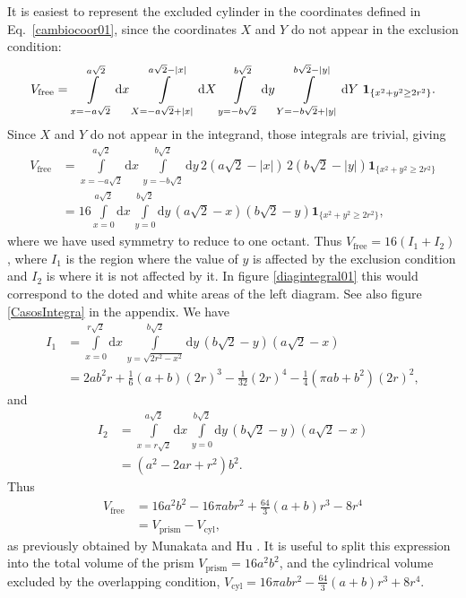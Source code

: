 \documentclass[superscriptaddress,pre,reprint,showpacs,onecolumn]{revtex4-1}
\newcommand{\rd}[1]{\mathrm{d}{#1} \,}
\newcommand{\indicatorsymbol}{\mathbf{1}}
\newcommand{\indicator}[1]{\indicatorsymbol_{ \{   #1 \} } }
\begin{document}
It is easiest to represent the  
excluded cylinder in the coordinates defined in 
Eq.~\ref{cambiocoor01}, since the coordinates $X$ and $Y$ 
do not appear in the exclusion condition:
\begin{equation}\label{integraltotal}
 V_\text{free} = \\ \int\limits_{x=-a \sqrt{2}}^{a \sqrt{2}} \rd x 
\int\limits_{X=-a \sqrt{2} + |x| }^{a \sqrt{2} - |x|}  \rd X
 \int\limits_{y=-b \sqrt{2}}^{b \sqrt{2}} \rd y
\int\limits_{Y=-b \sqrt{2} + |y| }^{b \sqrt{2}-|y|}  \rd Y
\, \indicator{ x^2 + y^2 \ge 2r^2  }.
\end{equation}
Since $X$ and $Y$ do not appear in the integrand, those integrals are trivial, giving
\begin{align}
 V_\text{free}  &= \int\limits_{x=-a \sqrt{2}}^{a \sqrt{2}} \rd x  \int\limits_{y=-b \sqrt{2}}^{b \sqrt{2}} \rd y
2 \left( a \sqrt{2} - |x| \right) \, 2 \left( b \sqrt{2} - |y| \right) \indicator{ x^2 + y^2 \ge 2r^2 } \\
 &= 16 \int\limits_{x=0}^{a \sqrt{2}} \rd x  \int\limits_{y=0}^{b \sqrt{2}} \rd y 
\left( a \sqrt{2} - x \right) \left( b \sqrt{2} - y \right) \indicator{ x^2 + y^2 \ge 2r^2 },
\end{align}
where we have used symmetry to reduce to one octant.
Thus $V_\text{free} = 16(I_1 + I_2)$, where $I_1$ is the region where the value of $y$
is affected by the exclusion condition and $I_2$ is where it is not affected
by it.  In figure \ref{diagintegral01} this would correspond to the doted and
white areas of the left diagram. See also figure \ref{CasosIntegra} in the appendix. 
We have
\begin{align}
 I_1 &= \int\limits_{x=0}^{r\sqrt{2}} \rd x \int\limits_{y = \sqrt{ 2r^2 - x^2}}^{b \sqrt{2}} \rd y
\left( b \sqrt{2} - y \right)  \left( a \sqrt{2} - x \right) \\
&= 	
2 a b^{2} r  + \textstyle \frac{1}{6} (a+b) (2r)^{3} - \frac{1}{32}  (2r)^{4} - \frac{1}{4} {\left(\pi a b + b^{2}\right)} (2r)^2,
\end{align}
and
\begin{align}
 I_2 &= \int\limits_{x=r  \sqrt{2}}^{a \sqrt{2}} \rd x  \int\limits_{y = 0}^{b \sqrt{2}} \rd y
 \left( b \sqrt{2} - y \right)  \left( a \sqrt{2} - x \right)  \\
&=	
{\left( a^{2} - 2ar +   r^{2}\right)} b^{2}.
\end{align}
Thus 
\begin{align}\label{volumeabd}
 V_\text{free}
 & =  16 a^{2} b^{2}  - 16 \pi a b r^{2} + \textstyle \frac{64}{3} (a+b) r^{3}  - 8 r^{4} \\
&= V_\text{prism} - V_\text{cyl},
\end{align}
as previously obtained by Munakata and Hu \cite{Munakata02}.
It is useful to split this expression into the total volume of the prism 
$V_\text{prism}=16 a^2 b^2$, and the cylindrical volume excluded by the overlapping
condition, 
$V_\text{cyl}=  16 \pi a b r^{2} - \textstyle \frac{64}{3} (a+b) r^{3}  + 8 r^{4}$.
\end{document}
